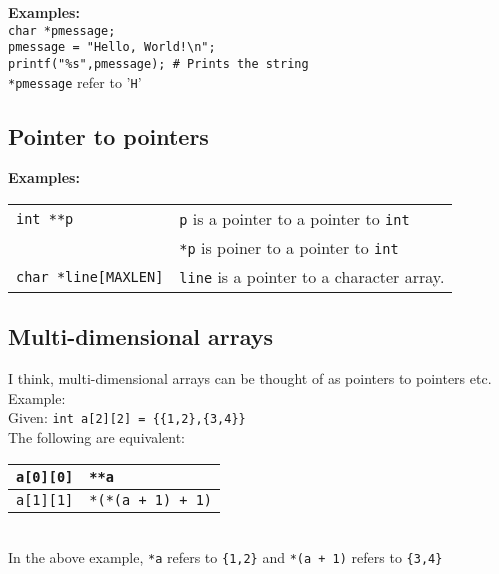 \begin{multicols*}{3}
\textbf{Examples:}\\

\texttt{char *pmessage;}\\
\texttt{pmessage = "Hello, World!\textbackslash n";} \\
\texttt{printf("\%s",pmessage); \# Prints the string}\\
\texttt{*pmessage} refer to '\texttt{H}'\\

\subsection{Pointer to pointers}

\textbf{Examples:}\\

\begin{tabularx}{\linewidth}{l|X}
\texttt{int **p} & \texttt{p} is a pointer to a pointer to \texttt{int}\\
& \texttt{*p} is poiner to a pointer to \texttt{int}\\
\texttt{char *line[MAXLEN]} & \texttt{line} is a pointer to a character array.\\

\end{tabularx}

\subsection{Multi-dimensional arrays}

I think, multi-dimensional arrays can be thought of as pointers to pointers etc.\\

Example:\\
Given: \texttt{int a[2][2] = \{\{1,2\},\{3,4\}\} } \\
The following are equivalent:\\

\begin{tabular}{l|l}
\hline
\texttt{a[0][0]} & \texttt{**a}\\
\hline
\texttt{a[1][1]} & \texttt{*(*(a + 1) + 1)}\\ 
\hline
\end{tabular}

\hspace{10pt}\\

In the above example, \texttt{*a} refers to \texttt{\{1,2\}} and \texttt{*(a + 1)} refers to \texttt{\{3,4\}}\\


\end{multicols*}
